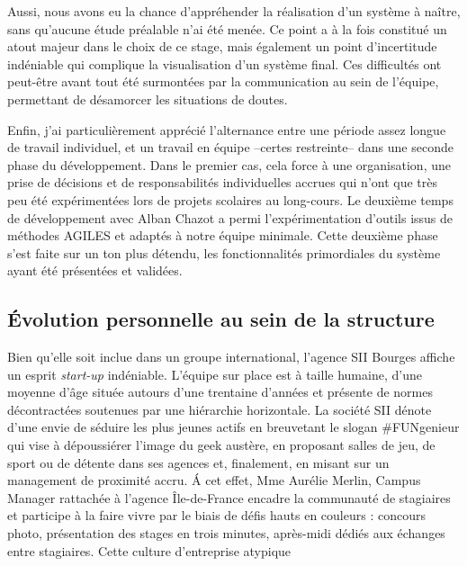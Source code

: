   Aussi, nous avons eu la chance d'appréhender la réalisation d'un système à naître, sans qu'aucune étude préalable n'ai été menée. 
  Ce point a à la fois constitué un atout majeur dans le choix de ce stage, mais également un point d'incertitude indéniable qui complique la visualisation d'un système final. 
  Ces difficultés ont peut-être avant tout été surmontées par la communication au sein de l'équipe, permettant de désamorcer les situations de doutes. 
  
  Enfin, j'ai particulièrement apprécié l'alternance entre une période assez longue de travail individuel, et un travail en équipe --certes restreinte-- dans une seconde phase du développement. 
  Dans le premier cas, cela force à une organisation, une prise de décisions et de responsabilités individuelles accrues qui n'ont que très peu été expérimentées lors de projets scolaires au long-cours.
  Le deuxième temps de développement avec Alban Chazot a permi l'expérimentation d'outils issus de méthodes AGILES et adaptés à notre équipe minimale.  
  Cette deuxième phase s'est faite sur un ton plus détendu, les fonctionnalités primordiales du système ayant été présentées et validées. 
  
  \subsection{\'{E}volution personnelle au sein de la structure}
  
  Bien qu'elle soit inclue dans un groupe international, l'agence SII Bourges affiche un esprit \emph{start-up} indéniable. 
  L'équipe sur place est à taille humaine, d'une moyenne d'âge située autours d'une trentaine d'années et présente de normes décontractées soutenues par une hiérarchie horizontale.
  La société SII dénote d'une envie de séduire les plus jeunes actifs en breuvetant le slogan #FUNgenieur qui vise à dépoussiérer l'image du geek austère, en proposant salles de jeu, de sport ou de détente dans ses agences et, 
  finalement, en misant sur un management de proximité accru.
  \'{A} cet effet, Mme Aurélie Merlin, Campus Manager rattachée à l'agence Île-de-France encadre la communauté de stagiaires et participe à la faire vivre par le biais de défis hauts en couleurs : concours photo, présentation 
  des stages en trois minutes, après-midi dédiés aux échanges entre stagiaires. 
  Cette culture d'entreprise atypique 
  
